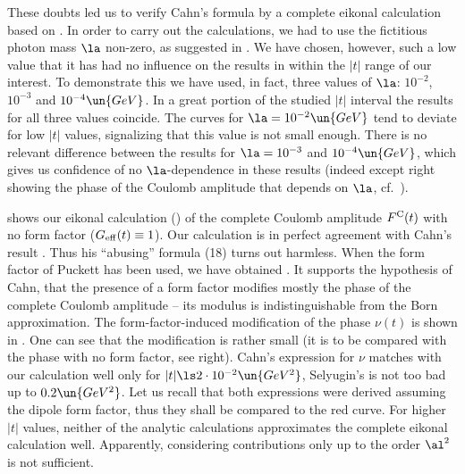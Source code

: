 These doubts led us to verify Cahn's formula by a complete eikonal calculation based on . In order to carry out the calculations, we had to use the fictitious photon mass $\la$ non-zero, as suggested in . We have chosen, however, such a low value that it has had no influence on the results in within the $|t|$ range of our interest. To demonstrate this we have used, in fact, three values of $\la$: $10^{-2}$, $10^{-3}$ and $10^{-4}\un{GeV}$. In a great portion of the studied $|t|$ interval the results for all three values coincide. The curves for $\la = 10^{-2} \un{GeV}$ tend to deviate for low $|t|$ values, signalizing that this value is not small enough. There is no relevant difference between the results for $\la = 10^{-3}$ and $10^{-4}\un{GeV}$, which gives us confidence of no $\la$-dependence in these results (indeed except  right showing the phase of the Coulomb amplitude that depends on $\la$, cf.~).


\bmfig
{}
%
\emfig

 shows our eikonal calculation () of the complete Coulomb amplitude $F^{\rm C}(t)$ with no form factor ($G_{\rm eff}(t) \equiv 1$). Our calculation is in perfect agreement with Cahn's result . Thus his ``abusing'' formula (18) turns out harmless. When the form factor of Puckett has been used, we have obtained . It supports the hypothesis of Cahn, that the presence of a form factor modifies mostly the phase of the complete Coulomb amplitude -- its modulus is indistinguishable from the Born approximation. The form-factor-induced modification of the phase $\nu(t)$ is shown in . One can see that the modification is rather small (it is to be compared with the phase with no form factor, see  right). Cahn's expression for $\nu$ matches with our calculation well only for $|t| \ls 2\cdot 10^{-2}\un{GeV^2}$, Selyugin's is not too bad up to $0.2\un{GeV^2}$. Let us recall that both expressions were derived assuming the dipole form factor, thus they shall be compared to the red curve. For higher $|t|$ values, neither of the analytic calculations approximates the complete eikonal calculation well. Apparently, considering contributions only up to the order $\al^2$ is not sufficient.

